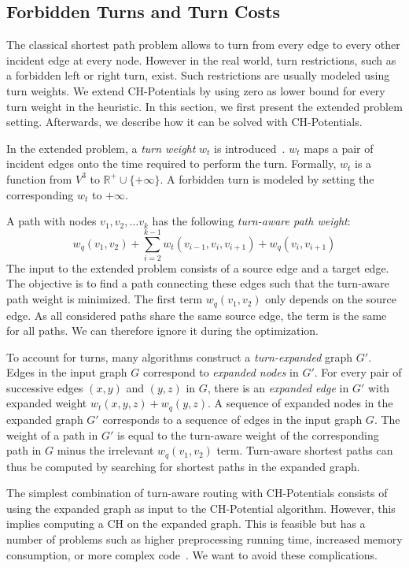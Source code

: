 \documentclass[letterpaper]{article} %
\begin{document}
\subsection{Forbidden Turns and Turn Costs}
\label{sec:no-turns}

The classical shortest path problem allows to turn from every edge to every other incident edge at every node.
However in the real world, turn restrictions, such as a forbidden left or right turn, exist.
Such restrictions are usually modeled using turn weights.
We extend CH-Potentials by using zero as lower bound for every turn weight in the heuristic.
In this section, we first present the extended problem setting.
Afterwards, we describe how it can be solved with CH-Potentials.

In the extended problem, a \emph{turn weight} $w_t$ is introduced~\cite{gv-errnt-11,dgpw-crprn-13,bwzz-cchtc-20}.
$w_t$ maps a pair of incident edges onto the time required to perform the turn.
Formally, $w_t$ is a function from $V^3$ to $\mathbb{R}^+ \cup \{+\infty\}$.
A forbidden turn is modeled by setting the corresponding $w_t$ to $+\infty$.

A path with nodes $v_1, v_2,\ldots v_k$ has the following \emph{turn-aware path weight}:\[
w_q(v_1, v_2) + \sum_{i=2}^{k-1}  w_t(v_{i-1},v_i,v_{i+1})  + w_q(v_i,v_{i+1})
\] The input to the extended problem consists of a source edge and a target edge.
The objective is to find a path connecting these edges such that the turn-aware path weight is minimized.
The first term $w_q(v_1, v_2)$ only depends on the source edge.
As all considered paths share the same source edge, the term is the same for all paths.
We can therefore ignore it during the optimization.

To account for turns, many algorithms construct a \emph{turn-expanded} graph $G'$.
Edges in the input graph $G$ correspond to \emph{expanded nodes} in $G'$.
For every pair of successive edges $(x,y)$ and $(y,z)$ in $G$, there is an \emph{expanded edge} in $G'$ with expanded weight $w_t(x,y,z) + w_q(y,z)$.
A sequence of expanded nodes in the expanded graph $G'$ corresponds to a sequence of edges in the input graph $G$.
The weight of a path in $G'$ is equal to the turn-aware weight of the corresponding path in $G$ minus the irrelevant $w_q(v_1,v_2)$ term.
Turn-aware shortest paths can thus be computed by searching for shortest paths in the expanded graph.

The simplest combination of turn-aware routing with CH-Potentials consists of using the expanded graph as input to the CH-Potential algorithm.
However, this implies computing a CH on the expanded graph.
This is feasible but has a number of problems such as higher preprocessing running time, increased memory consumption, or more complex code~\cite{gv-errnt-11}.
We want to avoid these complications.
\end{document}
